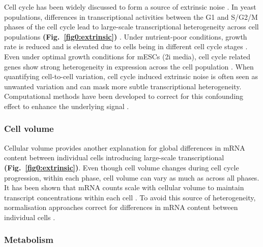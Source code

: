 Cell cycle has been widely discussed to form a  source of extrinsic noise \citep{Colman-Lerner2005, Newman2006}. 
In yeast populations, differences in transcriptional activities between the G1 and S/G2/M phases of the cell cycle lead to large-scale transcriptional heterogeneity across cell populations \textbf{(Fig.~\ref{fig0:extrinsic})} \citep{Zopf2013}. 
Under nutrient-poor conditions, growth rate is reduced and  is elevated due to cells being in different cell cycle stages \citep{Keren2015}. 
Even under optimal growth conditions for mESCs (2i media), cell cycle related genes show strong heterogeneity in expression across the cell population \citep{Kolodziejczyk2015cell}. 
When quantifying cell-to-cell variation, cell cycle induced extrinsic noise is often seen as unwanted variation and can mask more subtle transcriptional heterogeneity. 
Computational methods have been developed to correct for this confounding effect to enhance the underlying signal \citep{Buettner2015, Buettner2017}. 

\subsubsection{Cell volume}

Cellular volume provides another explanation for global differences in mRNA content between individual cells introducing large-scale transcriptional  \textbf{(Fig.~\ref{fig0:extrinsic})}. 
Even though cell volume changes during cell cycle progression, within each phase, cell volume can vary as much as across all phases. 
It has been shown that mRNA counts scale with cellular volume to maintain transcript concentrations within each cell \citep{Kempe2015, Padovan-Merhar2015, Zhurinsky2010}. 
To avoid this source of heterogeneity, normalisation approaches correct for differences in mRNA content between individual cells \citep{Vallejos2017}.

\subsubsection{Metabolism}

